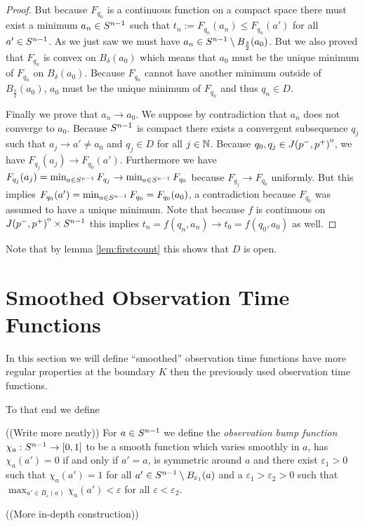 \begin{proof}
    But because $F_{q_n}$ is a continuous function on a compact space there must exist a minimum $a_n\in {S^{n-1}}$ such that $t_n:=F_{q_n}(a_n)\leq F_{q_n}(a')$ for all $a'\in {S^{n-1}}$. As we just saw we must have $a_n \in {S^{n-1}}\setminus B_{\frac{\delta}{2}}(a_0)$. But we also proved that $F_{q_n}$ is convex on $B_\delta(a_0)$ which means that $a_0$ must be the unique minimum of $F_{q_n}$ on $B_\delta(a_0)$. Because $F_{q_n}$ cannot have another minimum outside of $B_{\frac{\delta}{2}}(a_0)$, $a_0$ must be the unique minimum of $F_{q_n}$ and thus $q_n \in D$.

    Finally we prove that $a_n\to a_0$. We suppose by contradiction that $a_n$ does not converge to $a_0$. Because ${S^{n-1}}$ is compact there exists a convergent subsequence $q_j$ such that $a_j \to a' \neq a_0$ and $q_j \in D$ for all $j\in \mathbb{N}$. Because $q_0,q_j\in {\kern0ptJ(p^-,p^+)}^{\mathrm{o}}$, we have $F_{q_j}(a_j) \to F_{q_0}(a')$. Furthermore we have $F_{q_j}(a_j)= \min_{a\in {S^{n-1}}}F_{q_j} \to \min_{a\in {S^{n-1}}}F_{q_0}$ because $F_{q_j}\to F_{q_0}$ uniformly. But this implies $F_{q_0}(a') = \min_{a\in {S^{n-1}}}F_{q_0}=F_{q_0}(a_0)$, a contradiction because $F_{q_0}$ was assumed to have a unique minimum. Note that because $f$ is continuous on ${\kern0ptJ(p^-,p^+)}^{\mathrm{o}}\times {S^{n-1}}$ this implies $t_n=f(q_n,a_n)\to t_0 = f(q_0,a_0)$ as well.
\end{proof}
Note that by lemma \ref{lem:firstcount} this shows that $D$ is open.

\section{Smoothed Observation Time Functions}
In this section we will define \enquote{smoothed} observation time functions have more regular properties at the boundary $K$ then the previously used observation time functions.

To that end we define 
\begin{definition}\label{def:obsbumpfn}
    ((Write more neatly))
    For $a\in {S^{n-1}}$ we define the \emph{observation bump function} $\chi_{a}:{S^{n-1}}\to [0,1]$ to be a smooth function which varies smoothly in $a$, has $\chi_a(a')=0$ if and only if $a'=a$, is symmetric around $a$ and there exist $\varepsilon_1>0$ such that $\chi_{a}(a')=1$ for all $a'\in {S^{n-1}}\setminus B_{\varepsilon_1}(a)$ and a $\varepsilon_1 > \varepsilon_2 > 0$ such that $\max_{a'\in B_{\varepsilon}(a)} \chi_a(a')<\varepsilon$ for all $\varepsilon<\varepsilon_2$.
\end{definition}
((More in-depth construction))

